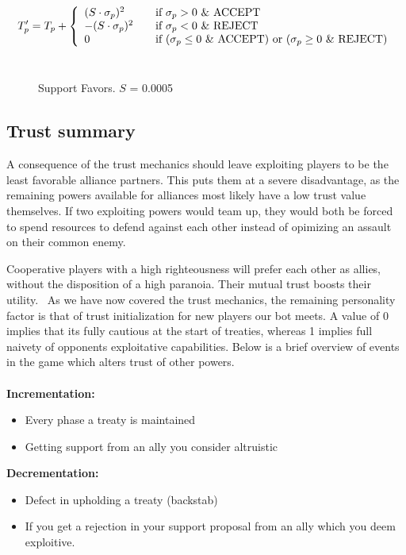 \documentclass[a4paper]{article} %
\begin{document}
  \[ T'_p = T_p + \left\{ 
  \begin{array}{l l}
    (S \cdot \sigma_p)^2 & \quad \text{if $\sigma_p > 0$ \& ACCEPT}\\
    -(S \cdot \sigma_p)^2 & \quad \text{if $\sigma_p < 0$ \& REJECT}\\
    \text{0} & \quad \text{if ($\sigma_p \le 0$ \& ACCEPT) or ($\sigma_p \geq 0$ \& REJECT)}
    
  \end{array} \right.\]
  \\
\begin{figure}[H]
\centering
{}
\caption{Support Favors. $S$ = 0.0005}
\label{fig:graph3}
\end{figure}

\subsection{Trust summary}

A consequence of the trust mechanics should leave exploiting players to be the least favorable alliance partners. This puts them at a severe disadvantage, as the remaining powers available for alliances most likely have a low trust value themselves. If two exploiting powers would team up, they would  both be forced to spend resources to defend against each other instead of opimizing an assault on their common enemy.

Cooperative players with a high righteousness will prefer each other as allies, without the disposition of a high paranoia. Their mutual trust boosts their utility.
\
As we have now covered the trust mechanics, the remaining personality factor is that of trust initialization for new players our bot meets. A value of 0 implies that its fully cautious at the start of treaties, whereas 1 implies full naivety of opponents exploitative capabilities. Below is a brief overview of events in the game which alters trust of other powers.\\
\
\\
\textbf{Incrementation:}
\begin{itemize}
\item {Every phase a treaty is maintained}
\item {Getting support from an ally you consider altruistic}
\end{itemize}
\textbf{Decrementation:}
\begin{itemize}
\item{Defect in upholding a treaty (backstab)}
\item{If you get a rejection in your support proposal from an ally which you deem exploitive.}
\end{itemize}
\end{document}
